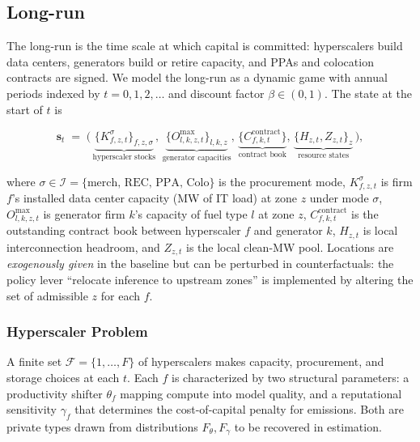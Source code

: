 \documentclass[12pt,letterpaper]{article}
\begin{document}
\subsection{Long-run}
\label{sec:longrun}

The long-run is the time scale at which capital is committed: hyperscalers
build data centers, generators build or retire capacity, and PPAs and
colocation contracts are signed. We model the long-run as a dynamic game
with annual periods indexed by $t = 0, 1, 2, \dots$ and discount factor
$\beta \in (0,1)$. The state at the start of $t$ is

\begin{equation}
\label{eq:lr_state}
\mathbf{s}_t \;=\; \big(\,
\underbrace{\{K_{f,z,t}^\sigma\}_{f,z,\sigma}}_{\text{hyperscaler stocks}},\,
\underbrace{\{O^{\max}_{l,k,z,t}\}_{l,k,z}}_{\text{generator capacities}},\,
\underbrace{\{C^{\text{contract}}_{f,k,t}\}}_{\text{contract book}},\,
\underbrace{\{H_{z,t}, Z_{z,t}\}_{z}}_{\text{resource states}}\,
\big),
\end{equation}

where $\sigma \in \mathcal{I} = \{\text{merch, REC, PPA, Colo}\}$ is the
procurement mode, $K_{f,z,t}^\sigma$ is firm $f$'s installed data center
capacity (MW of IT load) at zone $z$ under mode $\sigma$, $O^{\max}_{l,k,z,t}$
is generator firm $k$'s capacity of fuel type $l$ at zone $z$,
$C^{\text{contract}}_{f,k,t}$ is the outstanding contract book between
hyperscaler $f$ and generator $k$, $H_{z,t}$ is local interconnection
headroom, and $Z_{z,t}$ is the local clean-MW pool. Locations are
\emph{exogenously given} in the baseline but can be perturbed in
counterfactuals: the policy lever ``relocate inference to upstream zones''
is implemented by altering the set of admissible $z$ for each $f$.

\subsubsection{Hyperscaler Problem}
\label{sec:hyper_lr}

A finite set $\mathcal{F} = \{1,\dots,F\}$ of hyperscalers makes capacity,
procurement, and storage choices at each $t$. Each $f$ is characterized by
two structural parameters: a productivity shifter $\theta_f$ mapping compute
into model quality, and a reputational sensitivity $\gamma_f$ that determines
the cost-of-capital penalty for emissions. Both are private types drawn from
distributions $F_\theta, F_\gamma$ to be recovered in estimation.
\end{document}
